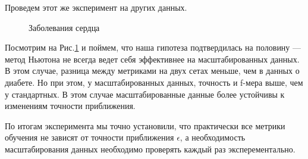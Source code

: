 \documentclass{article}
\begin{document}
	Проведем этот же эксперимент на других данных.
	
	\begin{figure}[H]
		\centering
		\hfill %
		\caption{Заболевания сердца}
		\label{fig:heart}
	\end{figure}
	
	Посмотрим на Рис.\ref{fig:heart} и поймем, что наша гипотеза подтвердилась на половину --- метод Ньютона не всегда ведет себя эффективнее на масштабированных данных. В этом случае, разница между метриками на двух сетах меньше, чем в данных о диабете. Но при этом, у масштабированных данных, точность и f-мера выше, чем у стандартных. В этом случае масштабированные данные более устойчивы к изменениям точности приближения.
	
	По итогам эксперимента мы точно установили, что практически все метрики обучения не зависят от точности приближения $\epsilon$, а необходимость масштабирования данных необходимо проверять каждый раз эксперементально.  
	
	
	
	
	
	
	
	
	
	
	
\end{document}
